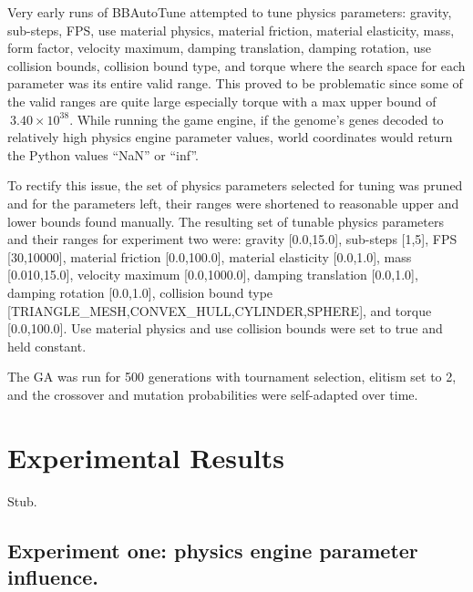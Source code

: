 Very early runs of BBAutoTune attempted to tune physics parameters: gravity, sub-steps, FPS, use material physics, material friction, material elasticity, mass, form factor, velocity maximum, damping translation, damping rotation, use collision bounds, collision bound type, and torque where the search space for each parameter was its entire valid range. This proved to be problematic since some of the valid ranges are quite large especially torque with a max upper bound of $~3.40\times10^{38}$. While running the game engine, if the genome's genes decoded to relatively high physics engine parameter values, world coordinates would return the Python values ``NaN'' or ``inf''.

To rectify this issue, the set of physics parameters selected for tuning was pruned and for the parameters left, their ranges were shortened to reasonable upper and lower bounds found manually. The resulting set of tunable physics parameters and their ranges for experiment two were: gravity [0.0,15.0], sub-steps [1,5], FPS [30,10000], material friction [0.0,100.0], material elasticity [0.0,1.0], mass [0.010,15.0], velocity maximum [0.0,1000.0], damping translation [0.0,1.0], damping rotation [0.0,1.0], collision bound type [TRIANGLE\_MESH,CONVEX\_HULL,CYLINDER,SPHERE], and torque [0.0,100.0]. Use material physics and use collision bounds were set to true and held constant. 

The GA was run for 500 generations with tournament selection, elitism set to 2, and the crossover and mutation probabilities were self-adapted over time.

\section{Experimental Results}

Stub.

\subsection[Experiment One]{Experiment one: physics engine parameter influence.}

